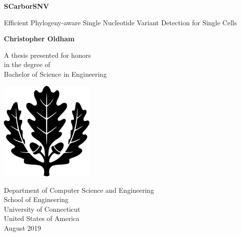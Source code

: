 \begin{titlepage}
   \begin{center}
       \vspace*{1cm}
 
       \Huge
       \textbf{SCarborSNV}
 
       \LARGE
       \vspace{0.5cm}
       Efficient Phylogeny-aware Single Nucleotide Variant Detection for Single Cells
 
       \vspace{1.6cm}
 
       \textbf{Christopher Oldham}
 
       \vspace{1.3cm}
 
       \Large
       A thesis presented for honors\\
       in the degree of\\
       Bachelor of Science in Engineering
 
       \vspace{1.5cm}
 
       \includegraphics[width=0.35\textwidth]{oakleafblack}

       \vspace{1.5cm}
 
       Department of Computer Science and Engineering\\
       School of Engineering\\
       University of Connecticut\\
       United States of America\\
       August 2019
 
   \end{center}
\end{titlepage}
